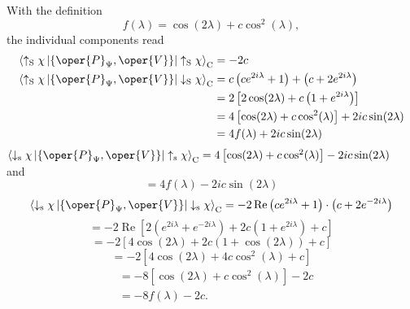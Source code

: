 With the definition
\begin{equation}
f(\lambda)=\cos (2 \lambda)+c \cos ^2(\lambda),
\end{equation}
the individual components read
\begin{equation}
\begin{aligned}
\left\langle\uparrow_{\mathrm{S}} \chi\left|\left\{\oper{P}_{\Psi}, \oper{V}\right\}\right| \uparrow_{\mathrm{S}} \chi\right\rangle_{\mathrm{C}} & =-2 c \\
\left\langle\uparrow_{\mathrm{S}} \chi\left|\left\{\oper{P}_{\Psi}, \oper{V}\right\}\right| \downarrow_{\mathrm{S}} \chi\right\rangle_{\mathrm{C}} & =c\left(c e^{2 i \lambda}+1\right)+\left(c+2 e^{2 i \lambda}\right) \\
& =2\left[2 \cos (2 \lambda)+c\left(1+e^{2 i \lambda}\right)\right] \\
& =4\left[\cos (2 \lambda)+c \cos ^2(\lambda)\right]+2 i c \sin (2 \lambda) \\
& =4 f(\lambda)+2 i c \sin (2 \lambda)
\end{aligned}
\end{equation}
$\left\langle\downarrow_{\mathrm{s}} \chi\left|\left\{\oper{P}_{\Psi}, \oper{V}\right\}\right| \uparrow_{\mathrm{s}} \chi\right\rangle_{\mathrm{C}}=4\left[\cos (2 \lambda)+c \cos ^2(\lambda)\right]-2 i c \sin (2 \lambda) \quad$ and
\begin{equation}
=4 f(\lambda)-2 i c \sin (2 \lambda)
\end{equation}
\begin{equation}
\left\langle\downarrow_{\mathrm{s}} \chi\left|\left\{\oper{P}_{\Psi}, \oper{V}\right\}\right| \downarrow_{\mathrm{s}} \chi\right\rangle_{\mathrm{C}}=-2 \operatorname{Re}\left(c e^{2 i \lambda}+1\right) \cdot\left(c+2 e^{-2 i \lambda}\right)
\end{equation}
\begin{equation}
=-2 \operatorname{Re}\left[2\left(e^{2 i \lambda}+e^{-2 i \lambda}\right)+2 c\left(1+e^{2 i \lambda}\right)+c\right]
\end{equation}
\begin{equation}
=-2[4 \cos (2 \lambda)+2 c(1+\cos (2 \lambda))+c]
\end{equation}
\begin{equation}
=-2\left[4 \cos (2 \lambda)+4 c \cos ^2(\lambda)+c\right]
\end{equation}
\begin{equation}
\begin{aligned}
& =-8\left[\cos (2 \lambda)+c \cos ^2(\lambda)\right]-2 c \\
& =-8 f(\lambda)-2 c .
\end{aligned}
\end{equation}

